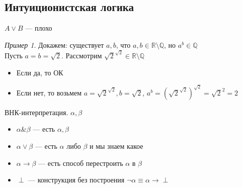 \documentclass[oneside]{book}
\newcommand{\R}{\mathbb{R}}
\theoremstyle{plain}
\theoremstyle{remark}
\newtheorem*{examp}{Пример}
\theoremstyle{definition}
\begin{document}
\section{Интуиционистская логика}
\label{sec:orgc6c8d3f}
\(A \vee B\) --- плохо
\begin{examp}
Докажем: существует \(a, b\), что \(a, b \in \R \setminus \mathbb{Q}\), но \(a^b \in \mathbb{Q}\) \\
Пусть \(a = b = \sqrt{2}\). Рассмотрим \(\sqrt{2}^{\sqrt{2}} \in \R \setminus \mathbb{Q}\)
\begin{itemize}
\item Если да, то ОК
\item Если нет, то возьмем \(a = \sqrt{2}^{\sqrt{2}}, b = \sqrt{2}\), \(a^b = (\sqrt{2}^{\sqrt{2}})^{\sqrt{2}} = \sqrt{2}^{2} = 2\)
\end{itemize}
\end{examp}
\begin{defintion}
ВНК-интерпретация. \(\alpha, \beta\)
\begin{itemize}
\item \(\alpha \& \beta\) --- есть \(\alpha, \beta\)
\item \(\alpha \vee \beta\) --- есть \(\alpha\) либо \(\beta\) и мы знаем какое
\item \(\alpha \to \beta\) --- есть способ перестроить \(\alpha\) в \(\beta\)
\item \(\perp\) --- конструкция без построения \(\neg \alpha \equiv \alpha \to \perp\)
\end{itemize}
\end{defintion}
\chapter{}
\label{sec:org6a785e0}
\end{document}
